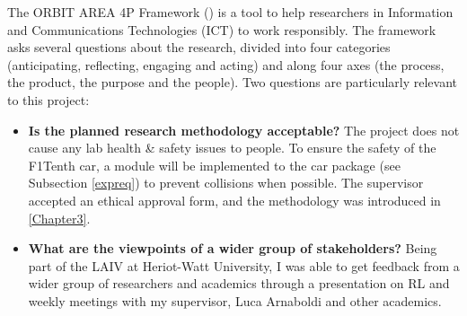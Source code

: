 The ORBIT AREA 4P Framework (\cite{orbit}) is a tool to help researchers in Information and Communications Technologies (ICT) to work responsibly. The framework asks several questions about the research, divided into four categories (anticipating, reflecting, engaging and acting) and along four axes (the process, the product, the purpose and the people). Two questions are particularly relevant to this project:
\begin{itemize}
	\item \textbf{Is the planned research methodology acceptable?} The project does not cause any lab health \& safety issues to people. To ensure the safety of the F1Tenth car, a module will be implemented to the car package (see Subsection \ref{expreq}) to prevent collisions when possible. The supervisor accepted an ethical approval form, and the methodology was introduced in \ref{Chapter3}.
	\item \textbf{What are the viewpoints of a wider group of stakeholders?} Being part of the LAIV at Heriot-Watt University, I was able to get feedback from a wider group of researchers and academics through a presentation on RL and weekly meetings with my supervisor, Luca Arnaboldi and other academics.
\end{itemize}